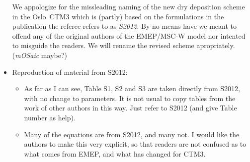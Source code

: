 \documentclass{scrartcl}
\begin{document}
\begin{itemize}
  We appologize for the missleading naming of the new dry deposition scheme in the Oslo~CTM3 which is (partly) based on the formulations in the publication the referee refers to as \emph{S2012}. By no means have we meant to offend any of the original authors of the EMEP/MSC-W model nor intented to misguide the readers. We will rename the revised scheme apropriately. (\emph{mOSaic} maybe?) 
\item {\color{blue} Reproduction of material from S2012:}
  \begin{itemize}
  \item {\color{blue} As far as I can see, Table S1, S2 and S3 are taken directly from S2012, with no change to parameters. It is not usual to copy tables from the work of other authors in this way.
    Just refer to S2012 (and give Table number as help).}
  \item {\color{blue} Many of the equations are from S2012, and many not. I would like the authors to
    make this very explicit, so that readers are not confused as to what comes from EMEP,
    and what has changed for CTM3.}
  \end{itemize}
\end{itemize}
\end{document}
